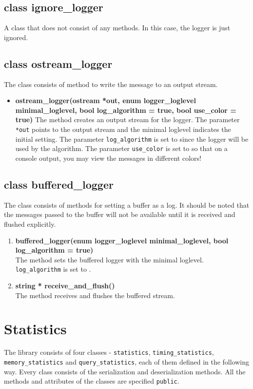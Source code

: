\subsection{class ignore\_logger}
A class that does not consist of any methods. In this case, the logger is just ignored.

\subsection{class ostream\_logger}
The class consists of method to write the message to an output stream. 
\begin{itemize}
 \item \textbf{ostream\_logger(ostream *out, enum logger\_loglevel minimal\_loglevel, bool log\_algorithm = true, bool use\_color = true)} \vskip 1pt
	The method creates an output stream for the logger. The parameter \texttt{*out} points to the output stream and the minimal loglevel indicates the initial setting. The parameter \texttt{log\_algorithm} is set to \true since the logger will be used by the algorithm. The parameter \texttt{use\_color} is set to \true so that on a console output, you may view the messages in different colors!
\end{itemize}

\subsection{class buffered\_logger}
The class consists of methods for setting a buffer as a log. It should be noted that the messages passed to the buffer will not be available until it is received and flushed explicitly.

\begin{enumerate}
 \item \textbf{buffered\_logger(enum logger\_loglevel minimal\_loglevel, bool log\_algorithm = true)} \\
	The method sets the buffered logger with the minimal loglevel. \texttt{log\_algorithm} is set to \true.
 \item \textbf{string * receive\_and\_flush()} \\
	The method receives and flushes the buffered stream.
\end{enumerate}

\section{Statistics}
The library consists of four classes - \texttt{statistics}, \texttt{timing\_statistics}, \texttt{memory\_statistics} and \texttt{query\_statistics}, each of them defined in the following way. Every class consists of the serialization and deserialization methods. All the methods and attributes of the classes are specified \texttt{public}.


